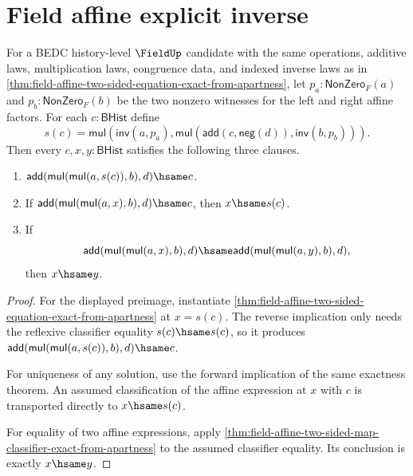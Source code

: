 \section{Field affine explicit inverse}
\label{sec:field-affine-explicit-inverse}

\begin{theorem}
\label{thm:field-affine-two-sided-explicit-inverse}
For a BEDC history-level $\FieldUp$ candidate with the same operations,
additive laws, multiplication laws, congruence data, and indexed inverse laws
as in
\autoref{thm:field-affine-two-sided-equation-exact-from-apartness}, let
$p_a:\mathsf{NonZero}_F(a)$ and $p_b:\mathsf{NonZero}_F(b)$ be the two
nonzero witnesses for the left and right affine factors. For each
$c:\mathsf{BHist}$ define
$$
s(c)=
\mathsf{mul}(\mathsf{inv}(a,p_a),
\mathsf{mul}(\mathsf{add}(c,\mathsf{neg}(d)),\mathsf{inv}(b,p_b))).
$$
Then every $c,x,y:\mathsf{BHist}$ satisfies the following three clauses.
\begin{enumerate}
\item $\mathsf{add}(\mathsf{mul}(\mathsf{mul}(a,s(c)),b),d)\hsame c$.
\item If
$\mathsf{add}(\mathsf{mul}(\mathsf{mul}(a,x),b),d)\hsame c$, then
$x\hsame s(c)$.
\item If
$$
\mathsf{add}(\mathsf{mul}(\mathsf{mul}(a,x),b),d)\hsame
\mathsf{add}(\mathsf{mul}(\mathsf{mul}(a,y),b),d),
$$
then $x\hsame y$.
\end{enumerate}
\end{theorem}
\begin{proof}
For the displayed preimage, instantiate
\autoref{thm:field-affine-two-sided-equation-exact-from-apartness} at
$x=s(c)$. The reverse implication only needs the reflexive classifier
equality $s(c)\hsame s(c)$, so it produces
$\mathsf{add}(\mathsf{mul}(\mathsf{mul}(a,s(c)),b),d)\hsame c$.

For uniqueness of any solution, use the forward implication of the same
exactness theorem. An assumed classification of the affine expression at
$x$ with $c$ is transported directly to $x\hsame s(c)$.

For equality of two affine expressions, apply
\autoref{thm:field-affine-two-sided-map-classifier-exact-from-apartness} to the
assumed classifier equality. Its conclusion is exactly $x\hsame y$.
\end{proof}

